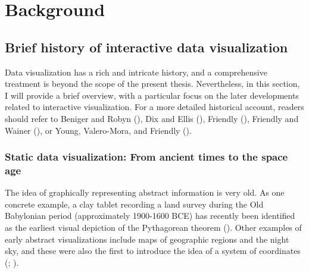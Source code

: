 \documentclass[
]{book}
\theoremstyle{definition}
\theoremstyle{definition}
\theoremstyle{definition}
\theoremstyle{definition}
\theoremstyle{remark}
\begin{document}
\chapter{Background}\label{litreview}

\section{Brief history of interactive data visualization}\label{brief-history}

Data visualization has a rich and intricate history, and a comprehensive treatment is beyond the scope of the present thesis. Nevertheless, in this section, I will provide a brief overview, with a particular focus on the later developments related to interactive visualization. For a more detailed historical account, readers should refer to Beniger and Robyn (), Dix and Ellis (), Friendly (), Friendly and Wainer (), or Young, Valero-Mora, and Friendly ().

\subsection{Static data visualization: From ancient times to the space age}\label{static-data-visualization-from-ancient-times-to-the-space-age}

The idea of graphically representing abstract information is very old. As one concrete example, a clay tablet recording a land survey during the Old Babylonian period (approximately 1900-1600 BCE) has recently been identified as the earliest visual depiction of the Pythagorean theorem (). Other examples of early abstract visualizations include maps of geographic regions and the night sky, and these were also the first to introduce the idea of a system of coordinates (; ).
\end{document}

